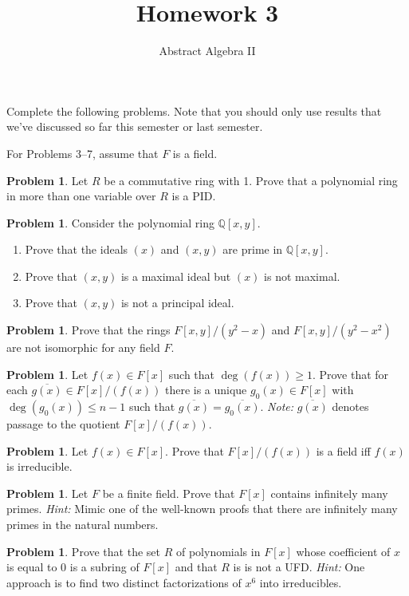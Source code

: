 \documentclass[11pt]{scrartcl}
\theoremstyle{definition}
\newtheorem{problem}[theorem]{Problem}
\newcommand{\blankline}{\pagebreak[2]\vspace{.5\baselineskip}}
\begin{document}
\title{Homework 3}
\subtitle{Abstract Algebra II}
\date{}

\maketitle
\thispagestyle{fancy}

Complete the following problems. Note that you should only use results that we've discussed so far this semester or last semester.

\blankline

For Problems 3--7, assume that $F$ is a field.

\begin{problem}
Let $R$ be a commutative ring with 1.  Prove that a polynomial ring in more than one variable over $R$ is a PID.
\end{problem}

\begin{problem}
Consider the polynomial ring $\mathbb{Q}[x,y]$.
\begin{enumerate}[label=\rm{(\alph*)}]
\item Prove that the ideals $(x)$ and $(x,y)$ are prime in $\mathbb{Q}[x,y]$.
\item Prove that $(x,y)$ is a maximal ideal but $(x)$ is not maximal.
\item Prove that $(x,y)$ is not a principal ideal.
\end{enumerate}
\end{problem}

\begin{problem}
Prove that the rings $F[x,y]/(y^2-x)$ and $F[x,y]/(y^2-x^2)$ are not isomorphic for any field $F$.
\end{problem}

\begin{problem}
Let $f(x)\in F[x]$ such that $\deg(f(x))\geq 1$.  Prove that for each $\overline{g(x)}\in F[x]/(f(x))$ there is a unique $g_0(x)\in F[x]$ with $\deg(g_0(x))\leq n-1$ such that $\overline{g(x)}=\overline{g_0(x)}$. \emph{Note:} $\overline{g(x)}$ denotes passage to the quotient $F[x]/(f(x))$.
\end{problem}

\begin{problem}
Let $f(x)\in F[x]$.  Prove that $F[x]/(f(x))$ is a field iff $f(x)$ is irreducible.
\end{problem}

\begin{problem}
Let $F$ be a finite field.  Prove that $F[x]$ contains infinitely many primes. \emph{Hint:} Mimic one of the well-known proofs that there are infinitely many primes in the natural numbers.  
\end{problem}

\begin{problem}
Prove that the set $R$ of polynomials in $F[x]$ whose coefficient of $x$ is equal to 0 is a subring of $F[x]$ and that $R$ is is not a UFD.  \emph{Hint:} One approach is to find two distinct factorizations of $x^6$ into irreducibles.
\end{problem}
\end{document}
